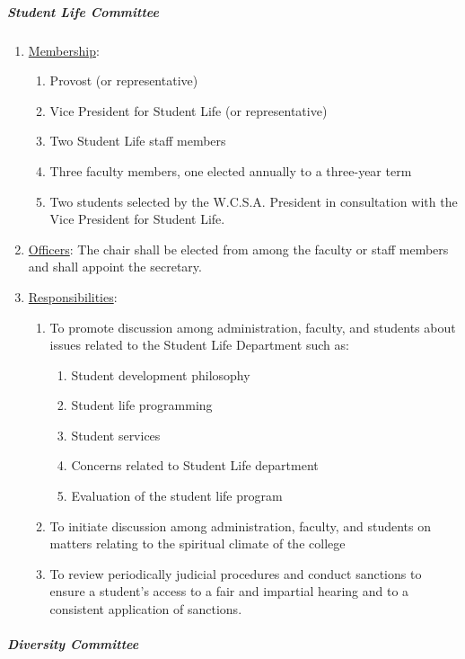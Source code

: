 				\subparagraph{Student Life Committee}
					\begin{enumerate}[label=\alph*)]
						\item{\underline{Membership}:
							\begin{enumerate}[label=\arabic*)]
								\item{Provost (or representative)}
								\item{Vice President for Student Life (or representative)}
								\item{Two Student Life staff members}
								\item{Three faculty members, one elected annually to a three-year term}
								\item{Two students selected by the W.C.S.A. President in consultation with the Vice President for Student Life.}
							\end{enumerate}
						}
						\item{\underline{Officers}:
							The chair shall be elected from among the faculty or staff members and shall appoint the secretary.
						}
						\item{\underline{Responsibilities}:
							\begin{enumerate}[label=\arabic*)]
								\item{To promote discussion among administration, faculty, and students about issues related to the Student Life Department such as:
									\begin{enumerate}[label=(\alph*)]
										\item{Student development philosophy}
										\item{Student life programming}
										\item{Student services}
										\item{Concerns related to Student Life department}
										\item{Evaluation of the student life program}
									\end{enumerate}
								}
								\item{To initiate discussion among administration, faculty, and students on matters relating to the spiritual climate of the college}
								\item{To review periodically judicial procedures and conduct sanctions to ensure a student's access to a fair and impartial hearing and to a consistent application of sanctions.}
							\end{enumerate}
						}
					\end{enumerate}
				\subparagraph{Diversity Committee}
